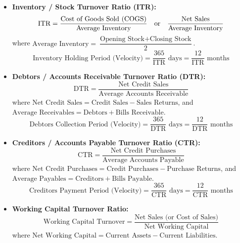 \begin{formulabox}
\begin{itemize}[leftmargin=*, noitemsep]
    \item \textbf{Inventory / Stock Turnover Ratio (ITR):}
    \begin{equation}
        \text{ITR} = \frac{\text{Cost of Goods Sold } (\operatorname{COGS})}{\text{Average Inventory}} \quad \text{or} \quad \frac{\text{Net Sales}}{\text{Average Inventory}}
    \end{equation}
    where $\text{Average Inventory} = \dfrac{\text{Opening Stock} + \text{Closing Stock}}{2}$.
    \begin{equation}
        \text{Inventory Holding Period (Velocity)} = \frac{365}{\text{ITR}} \text{ days} = \frac{12}{\text{ITR}} \text{ months}
    \end{equation}

    \item \textbf{Debtors / Accounts Receivable Turnover Ratio (DTR):}
    \begin{equation}
        \text{DTR} = \frac{\text{Net Credit Sales}}{\text{Average Accounts Receivable}}
    \end{equation}
    where $\text{Net Credit Sales} = \text{Credit Sales} - \text{Sales Returns}$, and $\text{Average Receivables} = \text{Debtors} + \text{Bills Receivable}$.
    \begin{equation}
        \text{Debtors Collection Period (Velocity)} = \frac{365}{\text{DTR}} \text{ days} = \frac{12}{\text{DTR}} \text{ months}
    \end{equation}

    \item \textbf{Creditors / Accounts Payable Turnover Ratio (CTR):}
    \begin{equation}
        \text{CTR} = \frac{\text{Net Credit Purchases}}{\text{Average Accounts Payable}}
    \end{equation}
    where $\text{Net Credit Purchases} = \text{Credit Purchases} - \text{Purchase Returns}$, and $\text{Average Payables} = \text{Creditors} + \text{Bills Payable}$.
    \begin{equation}
        \text{Creditors Payment Period (Velocity)} = \frac{365}{\text{CTR}} \text{ days} = \frac{12}{\text{CTR}} \text{ months}
    \end{equation}

    \item \textbf{Working Capital Turnover Ratio:}
    \begin{equation}
        \text{Working Capital Turnover} = \frac{\text{Net Sales (or Cost of Sales)}}{\text{Net Working Capital}}
    \end{equation}
    where $\text{Net Working Capital} = \text{Current Assets} - \text{Current Liabilities}$.


\end{itemize}
\end{formulabox}
